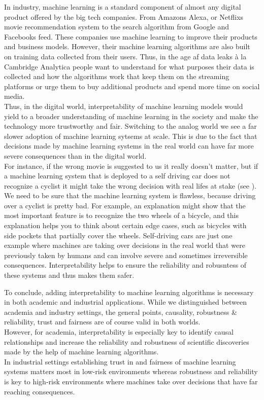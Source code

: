 \documentclass[]{krantz}
\begin{document}
In industry, machine learning is a standard component of almost any
digital product offered by the big tech companies. From Amazons Alexa,
or Netflixs movie recommendation system to the search algorithm from
Google and Facebooks feed. These companies use machine learning to
improve their products and business models. However, their machine
learning algorithms are also built on training data collected from their
users. Thus, in the age af data leaks à la Cambridge Analytica people
want to understand for what purposes their data is collected and how the
algorithms work that keep them on the streaming platforms or urge them
to buy additional products and spend more time on social media.\\
Thus, in the digital world, interpretability of machine learning models
would yield to a broader understanding of machine learning in the
society and make the technology more trustworthy and fair. Switching to
the analog world we see a far slower adoption of machine learning
sytsems at scale. This is due to the fact that decisions made by machine
learning systems in the real world can have far more severe consequences
than in the digital world.\\
For instance, if the wrong movie is suggested to us it really doesn't
matter, but if a machine learning system that is deployed to a self
driving car does not recognize a cyclist it might take the wrong
decision with real lifes at stake (see \citet{molnar2019}). We need to
be sure that the machine learning system is flawless, because driving
over a cyclist is pretty bad. For example, an explanation might show
that the most important feature is to recognize the two wheels of a
bicycle, and this explanation helps you to think about certain edge
cases, such as bicycles with side pockets that partially cover the
wheels. Self-driving cars are just one example where machines are taking
over decisions in the real world that were previously taken by humans
and can involve severe and sometimes irreversible consequences.
Interpretability helps to ensure the reliability and robusntess of these
systems and thus makes them safer.

To conclude, adding interpretability to machine learning algorithms is
necessary in both academic and industrial applications. While we
distinguished between academia and industry settings, the general
points, causality, robustness \& reliability, trust and fairness are of
course valid in both worlds.\\
However, for academia, interpretability is especially key to identify
causal relationships and increase the reliability and robustness of
scientific discoveries made by the help of machine learning
algorithms.\\
In industrial settings establishing trust in and fairness of machine
learning systems matters most in low-risk environments whereas
robustness and reliability is key to high-risk environments where
machines take over decisions that have far reaching consequences.
\end{document}

